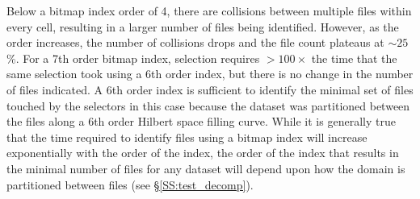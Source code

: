 \documentclass[apjl]{emulateapj}
\begin{document}
Below a bitmap index order of 4, there are collisions between multiple files within every cell, resulting in a larger number of files being identified. However, as the order increases, the number of collisions drops and the file count plateaus at $\sim25$\%. For a 7th order bitmap index, selection requires $>100\times$ the time that the same selection took using a 6th order index, but there is no change in the number of files indicated. A 6th order index is sufficient to identify the minimal set of files touched by the selectors in this case because the dataset was partitioned between the files along a 6th order Hilbert space filling curve. While it is generally true that the time required to identify files using a bitmap index will increase exponentially with the order of the index, the order of the index that results in the minimal number of files for any dataset will depend upon how the domain is partitioned between files (see \S\ref{SS:test_decomp}).

\end{document}

